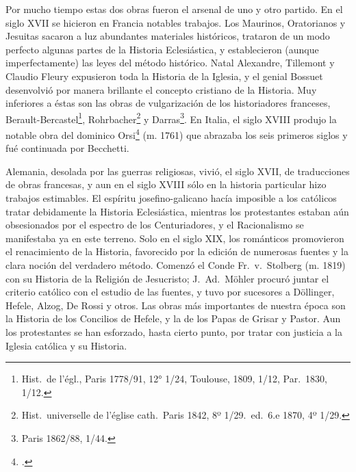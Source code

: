 \raggedbottom{} \documentclass[12pt, a4paper]{book}
\begin{document}
\begin{enumerate}
        Por mucho tiempo estas dos obras fueron el arsenal de uno y otro partido. En el siglo XVII se hicieron en Francia notables trabajos. Los Maurinos, Oratorianos y Jesuitas sacaron a luz abundantes materiales históricos, trataron de un modo perfecto algunas partes de la Historia Eclesiástica, y establecieron (aunque imperfectamente) las leyes del método histórico. Natal Alexandre, Tillemont y Claudio Fleury expusieron toda la Historia de la Iglesia, y el genial Bossuet desenvolvió por manera brillante el concepto cristiano de la Historia. Muy inferiores a éstas son las obras de vulgarización de los historiadores franceses, Berault-Bercastel\footnote{Hist.\ de l'égl., Paris 1778/91, 12° 1/24, Toulouse, 1809, 1/12, Par.\ 1830, 1/12.}, Rohrbacher\footnote{Hist.\ universelle de l'église cath.\ Paris 1842, 8º 1/29.\ ed.\ 6.e 1870, 4º 1/29.} y Darras\footnote{Paris 1862/88, 1/44.}. En Italia, el siglo XVIII produjo la notable obra del dominico Orsi\footcite{OrsiBecchetti1752Storia} (m. 1761) que abrazaba los seis primeros siglos y fué continuada por Becchetti.

        Alemania, desolada por las guerras religiosas, vivió, el siglo XVII, de traducciones de obras francesas, y aun en el siglo XVIII sólo en la historia particular hizo trabajos estimables. El espíritu josefino-galicano hacía imposible a los católicos tratar debidamente la Historia Eclesiástica, mientras los protestantes estaban aún obsesionados por el espectro de los Centuriadores, y el Racionalismo se manifestaba ya en este terreno. Solo en el siglo XIX, los románticos promovieron el renacimiento de la Historia, favorecido por la edición de numerosas fuentes y la clara noción del verdadero método. Comenzó el Conde Fr.\ v.\ Stolberg (m. 1819) con su Historia de la Religión de Jesucristo; J.\ Ad.\ Möhler procuró juntar el criterio católico con el estudio de las fuentes, y tuvo por sucesores a Döllinger, Hefele, Alzog, De Rossi y otros. Las obras más importantes de nuestra época son la Historia de los Concilios de Hefele, y la de los Papas de Grisar y Pastor. Aun los protestantes se han esforzado, hasta cierto punto, por tratar con justicia a la Iglesia católica y su Historia.
\end{enumerate}
\end{document}
